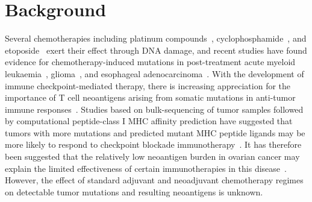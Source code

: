\section*{Background}

Several chemotherapies including platinum compounds~\cite{Hannan_1989}, cyclophosphamide~\cite{Anderson_1995}, and etoposide~\cite{NAKANOMYO_1986} exert their effect through DNA damage, and recent studies have found evidence for chemotherapy-induced mutations in post-treatment acute myeloid leukaemia~\cite{Ding_2012}, glioma~\cite{Johnson_2013}, and esophageal adenocarcinoma~\cite{Murugaesu_2015}. With the development of immune checkpoint-mediated therapy\cite{Chen_2013}, there is increasing appreciation for the importance of T cell neoantigens arising from somatic mutations in anti-tumor immune responses~\cite{Schumacher_2015}. Studies based on bulk-sequencing of tumor samples followed by computational peptide-class I MHC affinity prediction have suggested that tumors with more mutations and predicted mutant MHC peptide ligands may be more likely to respond to checkpoint blockade immunotherapy~\cite{Van_Allen_2015,Rizvi_2015}. It has therefore been suggested that the relatively low neoantigen burden in ovarian cancer may explain the limited effectiveness of certain immunotherapies in this disease~\cite{Martin_2016}. However, the effect of standard adjuvant and neoadjuvant chemotherapy regimes on detectable tumor mutations and resulting neoantigens is unknown.


